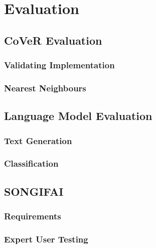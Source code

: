 \chapter{Evaluation}
\label{chap:evaluation}
\section{CoVeR Evaluation}
\subsection{Validating Implementation}
\subsection{Nearest Neighbours}
\section{Language Model Evaluation}
\subsection{Text Generation}
\subsection{Classification}
\section{SONGIFAI}
\subsection{Requirements}
\subsection{Expert User Testing}
